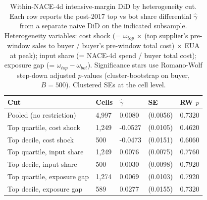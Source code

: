 \begin{table}[ht]
\centering
\caption{Within-NACE-4d intensive-margin DiD by heterogeneity cut.  Each row reports the post-2017 top vs bot share differential $\widehat{\gamma}$ from a separate naive DiD on the indicated subsample. Heterogeneity variables: cost shock (= $\omega_{top}$ $\times$ (top supplier's pre-window sales to buyer / buyer's pre-window total cost) $\times$ EUA at peak); input share (= NACE-4d spend / buyer total cost); exposure gap (= $\omega_{top} - \omega_{bot}$). Significance stars use Romano-Wolf step-down adjusted $p$-values (cluster-bootstrap on buyer, $B = 500$). Clustered SEs at the cell level.} 
\label{tab:phase4_within_intensive_did_mht_heterogeneity}
\begin{tabular}{llllr}
  \toprule
Cut & Cells & $\widehat{\gamma}$ & SE & RW $p$ \\ 
  \midrule
Pooled (no restriction) & 4,997 & 0.0080 & (0.0056) & 0.7320 \\ 
  Top quartile, cost shock & 1,249 & -0.0527 & (0.0105) & 0.4620 \\ 
  Top decile, cost shock &   500 & -0.0473 & (0.0151) & 0.6060 \\ 
  Top quartile, input share & 1,249 & 0.0076 & (0.0075) & 0.7760 \\ 
  Top decile, input share &   500 & 0.0030 & (0.0098) & 0.7920 \\ 
  Top quartile, exposure gap & 1,274 & 0.0069 & (0.0103) & 0.7920 \\ 
  Top decile, exposure gap &   589 & 0.0277 & (0.0155) & 0.7320 \\ 
   \bottomrule
\end{tabular}
\end{table}
